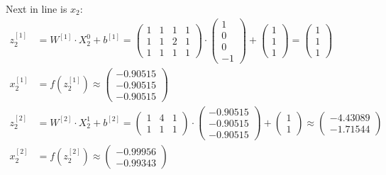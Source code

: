 \documentclass[12pt]{article}
\begin{document}
\begin{enumerate}[leftmargin=\labelsep]
          \vskip -0.2cm
          Next in line is $x_2$:
            \begingroup
            \allowdisplaybreaks
            \begin{align*}
                 z^{[1]}_2 &= {W}^{[1]} \cdot {X}^{0}_2 + {b}^{[1]} = \begin{pmatrix} 1 & 1 & 1 & 1 \\ 1 & 1 & 2 & 1 \\ 1 & 1 & 1 & 1\end{pmatrix} \cdot  \begin{pmatrix} 1 \\ 0 \\ 0 \\ -1 \end{pmatrix} +
                 \begin{pmatrix} 1 \\ 1 \\ 1\end{pmatrix} = \begin{pmatrix} 1 \\ 1 \\ 1\end{pmatrix} \\
                {x}^{[1]}_2 &= f\left({z}^{[1]}_2\right) \approx \begin{pmatrix} -0.90515 \\ -0.90515 \\ -0.90515\end{pmatrix} \\
                  z^{[2]}_2 &= {W}^{[2]} \cdot {X}^{1}_2 + {b}^{[2]} = \begin{pmatrix} 1 & 4 & 1 \\ 1 & 1 & 1\end{pmatrix} \cdot  \begin{pmatrix} -0.90515 \\ -0.90515 \\ -0.90515 \end{pmatrix} +
                \begin{pmatrix} 1 \\ 1\end{pmatrix} \approx \begin{pmatrix} -4.43089 \\ -1.71544\end{pmatrix} \\
                {x}^{[2]}_2 &= f\left({z}^{[2]}_2\right) \approx \begin{pmatrix} -0.99956 \\ -0.99343\end{pmatrix} \\

\end{align*}
\end{enumerate}
\end{document}

